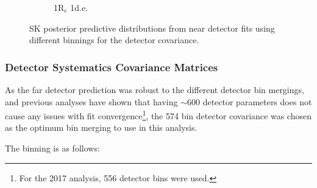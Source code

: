 \begin{figure}[!htbp]
\begin{subfigure}{.49\textwidth}
  \caption{1R$_{e}$ 1d.e.}
\end{subfigure}
\caption{SK posterior predictive distributions from near detector fits using different binnings for the detector covariance.}
\label{fig:detbinSK}
\end{figure}

\subsubsection{Detector Systematics Covariance Matrices}\label{sec:detmat}

As the far detector prediction was robust to the different detector bin mergings, and previous analyses have shown that having $\sim$600 detector parameters does not cause any issues with fit convergence\footnote{For the 2017 analysis, 556 detector bins were used.}, the 574 bin detector covariance was chosen as the optimum bin merging to use in this analysis.

The binning is as follows:

